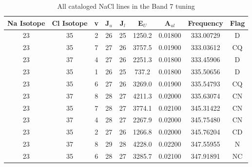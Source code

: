 \begin{table*}[htp]
\centering
\caption{All cataloged NaCl lines in the Band 7 tuning}
\begin{tabular}{ccccccccc}
\label{tab:Na_detections_B7}
Na Isotope & Cl Isotope & v & J$_u$ & J$_l$ & E$_U$ & A$_{ul}$ & Frequency & Flag \\
\hline
23 & 35 & 2 & 26 & 25 & 1250.2 & 0.01800 & 333.00729 & D \\
23 & 35 & 7 & 27 & 26 & 3757.5 & 0.01900 & 333.03612 & CQ \\
23 & 37 & 4 & 27 & 26 & 2251.3 & 0.01800 & 333.45906 & D \\
23 & 35 & 1 & 26 & 25 & 737.2 & 0.01800 & 335.50656 & D \\
23 & 35 & 6 & 27 & 26 & 3269.0 & 0.01900 & 335.54793 & CQ \\
23 & 37 & 8 & 28 & 27 & 4211.3 & 0.02000 & 335.63074 & CN \\
23 & 35 & 7 & 28 & 27 & 3774.1 & 0.02100 & 345.31422 & CN \\
23 & 37 & 4 & 28 & 27 & 2267.9 & 0.02000 & 345.75480 & CN \\
23 & 35 & 2 & 27 & 26 & 1266.8 & 0.02000 & 345.76204 & CD \\
23 & 37 & 8 & 29 & 28 & 4228.0 & 0.02200 & 347.55955 & N \\
23 & 35 & 6 & 28 & 27 & 3285.7 & 0.02100 & 347.91891 & NC \\
\hline
\end{tabular}

\par 
\end{table*}
